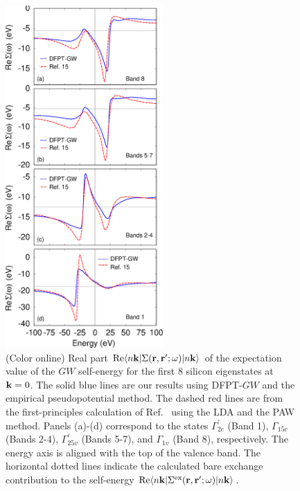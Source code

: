 \documentclass[twocolumn,prb,showpacs,superscriptaddress]{revtex4}
\def\w{\omega}
\def\k{{\bf k}}
\def\r{{\bf r}}
\def\rp{{\bf r^\prime}}
\begin{document}
\begin  {figure}
\begin  {center}
\includegraphics[width=6cm]{fig4.eps}
\end    {center}
\caption{\label{fig4}
        (Color online)
        Real part ${\rm Re} \langle n\k| \Sigma(\r,\rp;\w)|n\k\rangle$   of the expectation value of the $GW$ self-energy for the first 
        8 silicon eigenstates at $\k=0$. The solid blue lines are our results using DFPT-$GW$ and the empirical
        pseudopotential method. The dashed red lines are from the first-principles calculation of Ref.\  
        using the LDA and the PAW method. Panels (a)-(d) correspond to the states
        $\Gamma^\prime_{2c}$ (Band 1), $\Gamma_{15c}$ (Bands 2-4), $\Gamma^\prime_{25v}$ (Bands 5-7), 
        and $\Gamma_{1v}$ (Band 8), respectively. The energy axis is aligned with the top of the valence band.
        The horizontal dotted lines indicate the calculated bare exchange contribution to the self-energy ${\rm Re} \langle n\k| \Sigma^{\rm ex}(\r,\rp;\w)|n\k\rangle$.
        }
\end    {figure}
\end{document}

